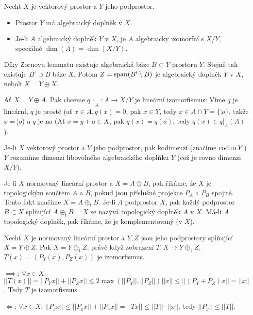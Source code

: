 \documentclass[12pt]{article}					%
\begin{document}
\begin{veta}
	Nechť $X$ je vektorový prostor a $Y$ jeho podprostor.

	\begin{itemize}
		\item Prostor $Y$ má algebraický doplněk v $X$.
		\item Je-li $A$ algebraický doplněk $Y$ v $X$, je $A$ algebraicky izomorfní s $X / Y$, speciálně $\dim(A) = \dim(X / Y)$.
	\end{itemize}

	\begin{dukazin}
		Díky Zornovu lemmatu existuje algebraická báze $B \subset Y$ prostoru $Y$. Stejně tak existuje $B' \supset B$ báze $X$. Potom $Z = \operatorname{span}(B' \setminus B)$ je algebraický doplněk $Y$ v $X$, neboli $X = Y \oplus X$.


		Ať $X = Y \oplus A$. Pak chceme $q\upharpoonright_A: A \rightarrow X / Y$ je lineární izomorfismus: Víme $q$ je lineární, $q$ je prosté (ať $x \in A, q(x) = 0$, pak $x \in Y$, tedy $x \in A \cap Y = \{¦o\}$, takže $x = ¦o$) a $q$ je na (Ať $x = y + a \in X$, pak $q(x) = q(a)$, tedy $q(x) \in q|_A(A)$). 
	\end{dukazin}
\end{veta}

\begin{definice}[Kodimenze]
	Je-li $X$ vektorový prostor a $Y$ jeho podprostor, pak kodimenzí (značíme $\operatorname{codim} Y$) $Y$ rozumíme dimenzi libovolného algebraického doplňku $Y$ (což je rovno dimenzi $X / Y$).
\end{definice}

\begin{definice}
	Je-li $X$ normovaný lineární prostor a $X = A \oplus B$, pak říkáme, že $X$ je topologickým součtem $A$ a $B$, pokud jsou příslušné projekce $P_A$ a $P_B$ spojité. Tento fakt značíme $X = A \oplus_t B$. Je-li $A$ podprostor $X$, pak každý podprostor $B \subset X$ splňující $A \oplus_t B = X$ se nazývá topologický doplněk $A$ v $X$. Má-li $A$ topologický doplněk, pak říkáme, že je komplementovaný (v $X$).
\end{definice}

\begin{veta}
	Nechť $X$ je normovaný lineární prostor a $Y, Z$ jsou jeho podprostory splňující $X = Y \oplus Z$. Pak $X = Y \oplus_t Z$, právě když zobrazení $T: X \rightarrow Y \oplus_1 Z$, $T(x) = (P_Y(x), P_Z(x))$ je izomorfismus.

	\begin{dukazin}
		$\implies$: $\forall x \in X$: $||T(x)|| = ||P_Y x|| + ||P_Z x|| ≤ 2\max (||P_Y||, ||P_Z||) ||x|| ≤ ||(P_Y + P_Z)x|| = ||x||$. Tedy $T$ je izomorfismus.

		$\Leftarrow$: $\forall x \in X$: $||P_yx|| ≤ ||P_yx|| + ||P_z x|| = ||T x|| ≤ ||T||·||x||$, tedy $||P_y|| ≤ ||T||$.
	\end{dukazin}
\end{veta}
\end{document}

